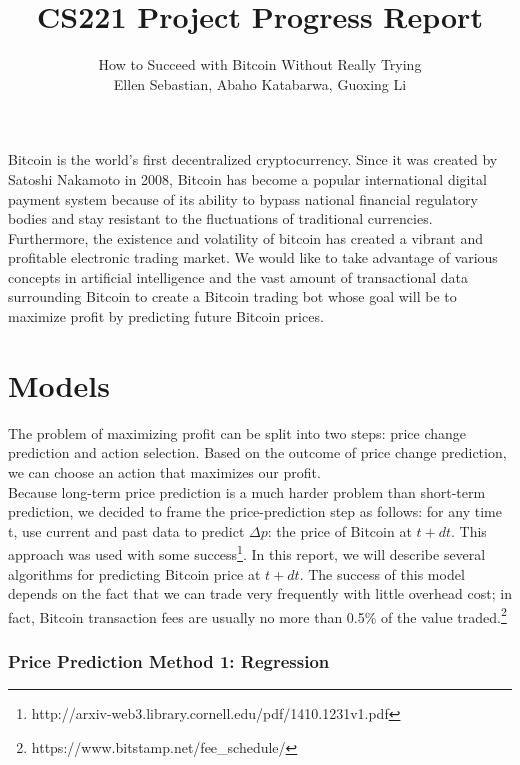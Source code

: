 \documentclass[10pt]{article}
\title{ CS221 Project Progress Report}
\author{How to Succeed with Bitcoin Without Really Trying \\Ellen Sebastian, Abaho Katabarwa, Guoxing Li  }
\begin{document}
\maketitle

 						
 Bitcoin is the world's first decentralized cryptocurrency. Since it was created by Satoshi Nakamoto in 2008, Bitcoin has become a popular international digital payment system because of its ability to bypass national financial regulatory bodies and stay resistant to the fluctuations of traditional currencies. Furthermore, the existence and volatility of bitcoin has created a vibrant and profitable electronic trading market. We would like to take advantage of various concepts in artificial intelligence and the vast amount of transactional data surrounding Bitcoin to create a Bitcoin trading bot whose goal will be to maximize profit by predicting future Bitcoin prices.
 
\section*{Models} 					
 
 
 The problem of maximizing profit can be split into two steps: price change prediction and action selection. Based on the outcome of price change prediction, we can choose an action that maximizes our profit. \\
 Because long-term price prediction is a much harder problem than short-term prediction, we decided to frame the price-prediction step as follows: for any 
 time t, use current and past data to predict $\Delta p$: the price of Bitcoin at $t+dt$. This approach was used with some success\footnote{http://arxiv-web3.library.cornell.edu/pdf/1410.1231v1.pdf}. In this report, we will describe several algorithms for predicting Bitcoin price at $t + dt$.  The success of this model depends on the fact that we can trade very frequently with little overhead cost; in fact, Bitcoin transaction fees are usually no more than 0.5\% of the value traded.\footnote{https://www.bitstamp.net/fee\_schedule/}
 
  \subsubsection*{Price Prediction Method 1: Regression} 					
				
\end{document}
